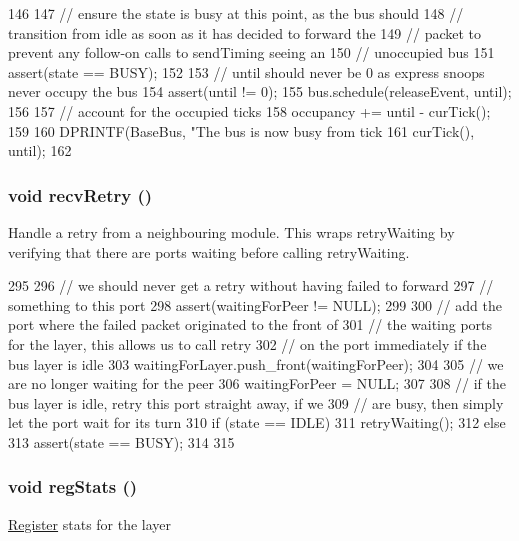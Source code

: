 \begin{DoxyCode}
146 {
147     // ensure the state is busy at this point, as the bus should
148     // transition from idle as soon as it has decided to forward the
149     // packet to prevent any follow-on calls to sendTiming seeing an
150     // unoccupied bus
151     assert(state == BUSY);
152 
153     // until should never be 0 as express snoops never occupy the bus
154     assert(until != 0);
155     bus.schedule(releaseEvent, until);
156 
157     // account for the occupied ticks
158     occupancy += until - curTick();
159 
160     DPRINTF(BaseBus, "The bus is now busy from tick %
161             curTick(), until);
162 }
\end{DoxyCode}
\hypertarget{classBaseBus_1_1Layer_a29cb5a4f98063ce6e9210eacbdb35298}{
\subsubsection[{recvRetry}]{\setlength{\rightskip}{0pt plus 5cm}void recvRetry ()}}
\label{classBaseBus_1_1Layer_a29cb5a4f98063ce6e9210eacbdb35298}
Handle a retry from a neighbouring module. This wraps retryWaiting by verifying that there are ports waiting before calling retryWaiting. 


\begin{DoxyCode}
295 {
296     // we should never get a retry without having failed to forward
297     // something to this port
298     assert(waitingForPeer != NULL);
299 
300     // add the port where the failed packet originated to the front of
301     // the waiting ports for the layer, this allows us to call retry
302     // on the port immediately if the bus layer is idle
303     waitingForLayer.push_front(waitingForPeer);
304 
305     // we are no longer waiting for the peer
306     waitingForPeer = NULL;
307 
308     // if the bus layer is idle, retry this port straight away, if we
309     // are busy, then simply let the port wait for its turn
310     if (state == IDLE) {
311         retryWaiting();
312     } else {
313         assert(state == BUSY);
314     }
315 }
\end{DoxyCode}
\hypertarget{classBaseBus_1_1Layer_a4dc637449366fcdfc4e764cdf12d9b11}{
\subsubsection[{regStats}]{\setlength{\rightskip}{0pt plus 5cm}void regStats ()}}
\label{classBaseBus_1_1Layer_a4dc637449366fcdfc4e764cdf12d9b11}
\hyperlink{classRegister}{Register} stats for the layer 


